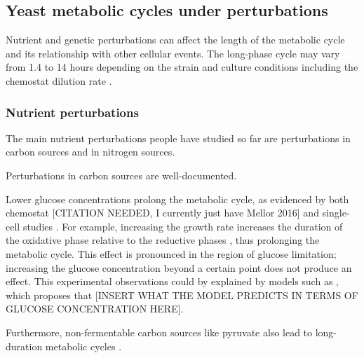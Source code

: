 \subsection{Yeast metabolic cycles under perturbations}
\label{subsec:intro-ymc-perturbations}

Nutrient and genetic perturbations can affect the length of the metabolic cycle and its relationship with other cellular events.
The long-phase cycle may vary from 1.4 to 14 hours depending on the strain and culture conditions including the chemostat dilution rate \citep{caustonMetabolicRhythmsFramework2018}. %

\subsubsection{Nutrient perturbations}
\label{subsubsec:intro-ymc-perturbations-nutrient}

The main nutrient perturbations people have studied so far are perturbations in carbon sources and in nitrogen sources.

Perturbations in carbon sources are well-documented.

Lower glucose concentrations prolong the metabolic cycle, as evidenced by both chemostat [CITATION NEEDED, I currently just have Mellor 2016] and single-cell studies \parencite{papagiannakisAutonomousMetabolicOscillations2017}.
For example, increasing the growth rate increases the duration of the oxidative phase relative to the reductive phases \citep{slavovCouplingGrowthRate2011}, thus prolonging the metabolic cycle.
This effect is pronounced in the region of glucose limitation;
increasing the glucose concentration beyond a certain point does not produce an effect.
This experimental observations could by explained by models such as \textcite{jonesCyberneticModelGrowth1999}, which proposes that [INSERT WHAT THE MODEL PREDICTS IN TERMS OF GLUCOSE CONCENTRATION HERE].

Furthermore, non-fermentable carbon sources like pyruvate also lead to long-duration metabolic cycles \parencite{papagiannakisAutonomousMetabolicOscillations2017}.

